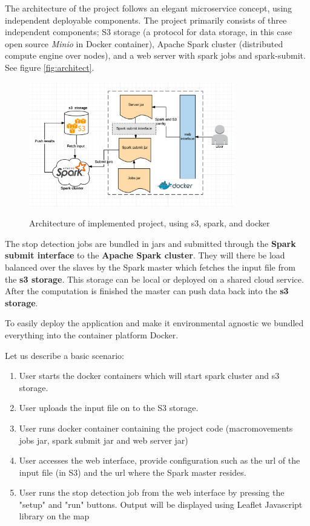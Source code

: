 The architecture of the project follows an elegant microservice concept, using independent deployable components.
The project primarily consists of three independent components; S3 storage (a protocol for data storage, in this case open source \textit{Minio} in Docker container), Apache Spark cluster (distributed compute engine over nodes), and a web server with spark jobs and spark-submit. See figure \autoref{fig:architect}.

\begin{figure}[!ht]
	\centering
	\includegraphics[width=0.8\textwidth]{images/architect.png}\\
	\caption{ Architecture of implemented project, using s3, spark, and docker}
	\label{fig:architect}
\end{figure}
\FloatBarrier

The stop detection jobs are bundled in jars and submitted through the \textbf{Spark submit interface} to the \textbf{Apache Spark cluster}. They will there be load balanced over the slaves by the Spark master which fetches the input file from the \textbf{s3 storage}. This storage can be local or deployed on a shared cloud service. After the computation is finished the master can push data back into the \textbf{s3 storage}.

To easily deploy the application and make it environmental agnostic we bundled everything into the container platform Docker. 

Let us describe a basic scenario:

\begin{enumerate}
  \item 
User starts the docker containers which will start spark cluster and s3 storage.
  \item 
User uploads the input file on to the S3 storage.
  \item 
User runs docker container containing the project code (macromovements jobs jar, spark submit jar and web server jar)
  \item 
User accesses the web interface, provide configuration such as the url of the input file (in S3) and the url where the Spark master resides.  
  \item 
User runs the stop detection job from the web interface by pressing the "setup" and "run" buttons. Output will be displayed using Leaflet Javascript library on the map
\end{enumerate}

